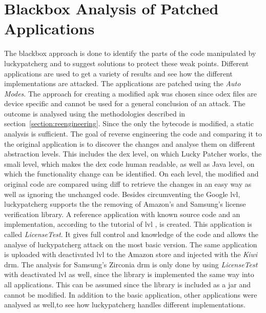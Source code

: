 \section{Blackbox Analysis of Patched Applications} \label{section:luckypatcher-operation}
The blackbox approach is done to identify the parts of the code manipulated by \gls{luckypatcherg} and to suggest solutions to protect these weak points.
Different applications are used to get a variety of results and see how the different implementations are attacked.
\newline
The applications are patched using the \textit{Auto Modes}.
The approach for creating a modified \gls{apk} was chosen since \gls{odex} files are device specific and cannot be used for a general conclusion of an attack.
The outcome is analysed using the methodologies described in  section~\ref{section:reengineering}.
Since the only the bytecode is modified, a static analysis is sufficient.
\newline
The goal of reverse engineering the code and comparing it to the original application is to discover the changes and analyse them on different abstraction levels.
This includes the \gls{dex} level, on which Lucky Patcher works, the smali level, which makes the \gls{dex} code human readable, as well as Java level, on which the functionality change can be identified.
On each level, the modified and original code are compared using diff to retrieve the changes in an easy way as well as ignoring the unchanged code.
\newline
\newline
Besides circumventing the Google \gls{lvl}, \gls{luckypatcherg} supports the the removing of Amazon's and Samsung's license verification library.
A reference application with known source code and an implementation, according to the tutorial of \gls{lvl} \cite{developersLicensingAdding}, is created.
This application is called \textit{LicenseTest}.
It gives full control and knowledge of the code and allows the analyse of \gls{luckypatcherg} attack on the most basic version.
The same application is uploaded with deactivated \gls{lvl} to the Amazon store and injected with the \textit{Kiwi} \gls{drm}.
The analysis for Samsung’s Zirconia \gls{drm} is only done by using \textit{LicenseTest} with deactivated \gls{lvl} as well, since the library is implemented the same way into all applications.
This can be assumed since the library is included as a \gls{jar} and cannot be modified.
In addition to the basic application, other applications were analysed as well,to see how \gls{luckypatcherg} handles different implementations.
